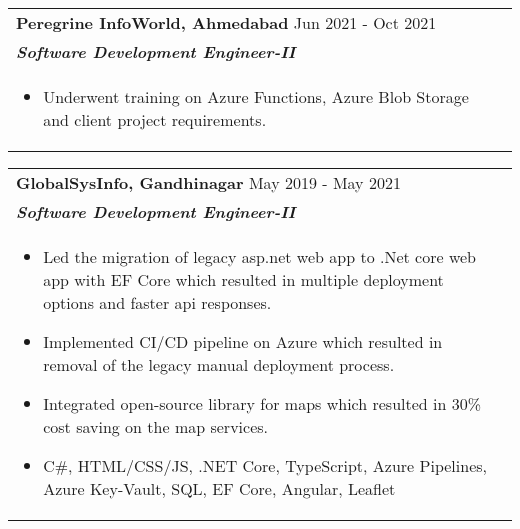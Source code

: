 \documentclass[a4paper,20pt]{article}
\begin{document}
\begin{tabularx}{\linewidth}{ @{}l r@{} }
    \color[HTML]{1C033C} \textbf{{Peregrine InfoWorld, Ahmedabad}} \hfill \color[HTML]{371e77} Jun 2021 - Oct 2021 \\[4pt]
    \color[HTML]{371e77}\textbf{\textit{Software Development Engineer-II}}\ \hfill \color[HTML]{4B28A4}            \\[5pt]
    \begin{minipage}[t]{\linewidth}
        \begin{itemize}[nosep,after=\strut, leftmargin=2em, itemsep=2pt]
            \item Underwent training on Azure Functions, Azure Blob Storage and client project requirements.
        \end{itemize}
    \end{minipage}
\end{tabularx}

\begin{tabularx}{\linewidth}{ @{}l r@{} }
    \color[HTML]{1C033C} \textbf{{GlobalSysInfo, Gandhinagar}} \hfill \color[HTML]{371e77} May 2019 - May 2021 \\[4pt]
    \color[HTML]{371e77}\textbf{\textit{Software Development Engineer-II}}\ \hfill \color[HTML]{4B28A4}        \\[5pt]
    \begin{minipage}[t]{\linewidth}
        \begin{itemize}[nosep,after=\strut, leftmargin=2em, itemsep=2pt]
            \item Led the migration of legacy asp.net web app to .Net core web app with EF Core which resulted in multiple deployment options and faster api responses.
            \item Implemented CI/CD pipeline on Azure which resulted in removal of the legacy manual deployment process.
            \item Integrated open-source library for maps which resulted in 30\% cost saving on the map services.
            \item C\#, HTML/CSS/JS, .NET Core, TypeScript, Azure Pipelines, Azure Key-Vault, SQL, EF Core, Angular, Leaflet
        \end{itemize}
    \end{minipage}
\end{tabularx}
\end{document}
